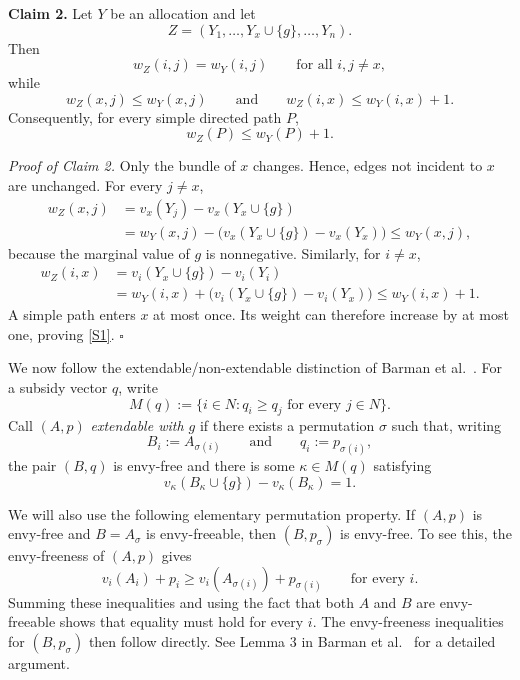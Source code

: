 \documentclass[11pt]{article}
\makeatletter
\theoremstyle{plain}
\theoremstyle{plain}
\renewenvironment{proof}[1][\proofname]{\par
  \pushQED{\qed}%
  \normalfont \topsep6\p@\@plus6\p@\relax
  \trivlist
  \item[\hskip\labelsep\bfseries #1\@addpunct{}]\ignorespaces
}{%
  \popQED\endtrivlist\@endpefalse
}
\makeatother
\begin{document}
\begin{proof}
\medskip
\noindent
\textbf{Claim 2.}
Let $Y$ be an allocation and let
\[
Z=(Y_1,\ldots,Y_x\cup\{g\},\ldots,Y_n).
\]
Then
\[
w_Z(i,j)=w_Y(i,j)
\qquad
\text{for all }i,j\neq x,
\]
while
\[
w_Z(x,j)\leq w_Y(x,j)
\qquad\text{and}\qquad
w_Z(i,x)\leq w_Y(i,x)+1.
\]
Consequently, for every simple directed path $P$,
\begin{equation}\label{S1}
    w_Z(P)\leq w_Y(P)+1.
\end{equation}

\smallskip
\noindent
\emph{Proof of Claim 2.}
Only the bundle of $x$ changes. Hence, edges not incident to $x$ are unchanged. For every $j\neq x$,
\[
\begin{aligned}
w_Z(x,j)
&=v_x(Y_j)-v_x(Y_x\cup\{g\})\\
&=w_Y(x,j)
-\bigl(v_x(Y_x\cup\{g\})-v_x(Y_x)\bigr)
\leq w_Y(x,j),
\end{aligned}
\]
because the marginal value of $g$ is nonnegative. Similarly, for
$i\neq x$,
\[
\begin{aligned}
w_Z(i,x)
&=v_i(Y_x\cup\{g\})-v_i(Y_i)\\
&=w_Y(i,x)
+\bigl(v_i(Y_x\cup\{g\})-v_i(Y_x)\bigr)
\leq w_Y(i,x)+1.
\end{aligned}
\]
A simple path enters $x$ at most once. Its weight can therefore increase by at most one, proving \eqref{S1}.
\hfill$\square$

\medskip
We now follow the extendable/non-extendable distinction of Barman et al.~\cite{BKNS22}. For a subsidy vector $q$, write
\[
M(q):=\{i\in N:q_i\geq q_j\text{ for every }j\in N\}.
\]
Call $(A,p)$ \emph{extendable with $g$} if there exists a permutation $\sigma$ such that, writing
\[
B_i:=A_{\sigma(i)}
\qquad\text{and}\qquad
q_i:=p_{\sigma(i)},
\]
the pair $(B,q)$ is envy-free and there is some
$\kappa\in M(q)$ satisfying
\begin{equation}\label{S2}
 v_\kappa(B_\kappa\cup\{g\})-v_\kappa(B_\kappa)=1.
\end{equation}


We will also use the following elementary permutation property. If $(A,p)$ is envy-free and $B=A_\sigma$ is envy-freeable, then $(B,p_\sigma)$ is envy-free. To see this, the envy-freeness of
$(A,p)$ gives
\[
v_i(A_i)+p_i
\geq
v_i(A_{\sigma(i)})+p_{\sigma(i)}
\qquad\text{for every }i.
\]
Summing these inequalities and using the fact that both $A$ and $B$ are envy-freeable shows that equality must hold for every $i$. The envy-freeness inequalities for $(B,p_\sigma)$ then follow directly. See Lemma 3 in Barman et al.~\cite{BKNS22} for a detailed argument.


\end{proof}
\end{document}
